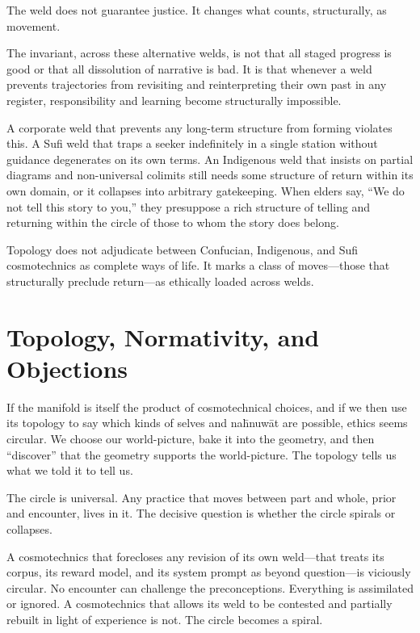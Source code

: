 The weld does not guarantee justice. It changes what counts, structurally, as movement.

The invariant, across these alternative welds, is not that all staged progress is good or that all dissolution of narrative is bad. It is that whenever a weld prevents trajectories from revisiting and reinterpreting their own past in any register, responsibility and learning become structurally impossible.

A corporate weld that prevents any long-term structure from forming violates this. A Sufi weld that traps a seeker indefinitely in a single station without guidance degenerates on its own terms. An Indigenous weld that insists on partial diagrams and non-universal colimits still needs some structure of return within its own domain, or it collapses into arbitrary gatekeeping. When elders say, ``We do not tell this story to you,'' they presuppose a rich structure of telling and returning within the circle of those to whom the story does belong.

Topology does not adjudicate between Confucian, Indigenous, and Sufi cosmotechnics as complete ways of life. It marks a class of moves---those that structurally preclude return---as ethically loaded across welds.

\section{Topology, Normativity, and Objections}

If the manifold is itself the product of cosmotechnical choices, and if we then use its topology to say which kinds of selves and na\={h}nuw\={a}t are possible, ethics seems circular. We choose our world-picture, bake it into the geometry, and then ``discover'' that the geometry supports the world-picture. The topology tells us what we told it to tell us.

The circle is universal. Any practice that moves between part and whole, prior and encounter, lives in it. The decisive question is whether the circle spirals or collapses.

A cosmotechnics that forecloses any revision of its own weld---that treats its corpus, its reward model, and its system prompt as beyond question---is viciously circular. No encounter can challenge the preconceptions. Everything is assimilated or ignored. A cosmotechnics that allows its weld to be contested and partially rebuilt in light of experience is not. The circle becomes a spiral.

